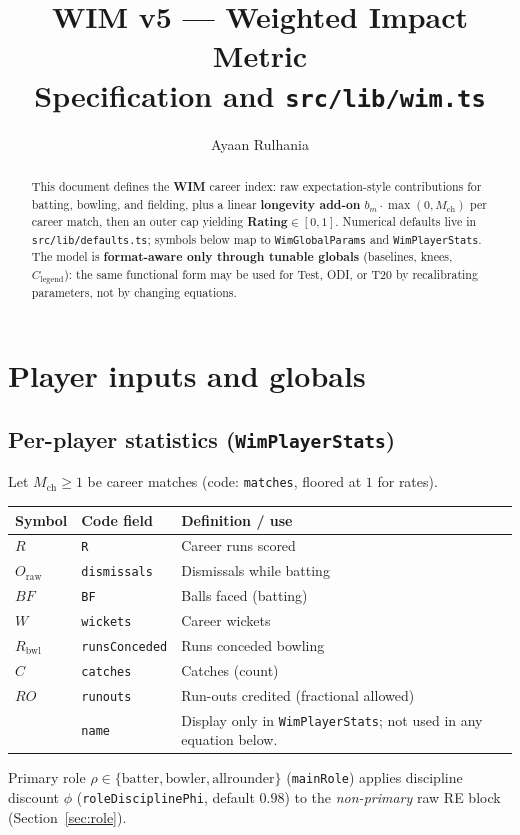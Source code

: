 \documentclass[12pt,a4paper]{article}
\title{WIM v5 --- Weighted Impact Metric\\{\large Specification and \texttt{src/lib/wim.ts}}}
\author{Ayaan Rulhania}
\date{}
\begin{document}
\maketitle

\begin{abstract}
This document defines the \textbf{WIM} career index: raw expectation-style contributions for batting, bowling, and fielding, plus a linear \textbf{longevity add-on} $b_m\cdot\max(0,M_{\mathrm{ch}})$ per career match, then an outer cap yielding \textbf{Rating}$\in[0,1]$.
Numerical defaults live in \texttt{src/lib/defaults.ts}; symbols below map to \texttt{WimGlobalParams} and \texttt{WimPlayerStats}.
The model is \textbf{format-aware only through tunable globals} (baselines, knees, $C_{\mathrm{legend}}$): the same functional form may be used for Test, ODI, or T20 by recalibrating parameters, not by changing equations.
\end{abstract}

\section{Player inputs and globals}

\subsection{Per-player statistics (\texttt{WimPlayerStats})}
Let $M_{\mathrm{ch}}\ge 1$ be career matches (code: \texttt{matches}, floored at $1$ for rates).
\begin{center}
\begin{tabular}{l|l|l}
\hline
Symbol & Code field & Definition / use \\
\hline
$R$ & \texttt{R} & Career runs scored \\
$O_{\mathrm{raw}}$ & \texttt{dismissals} & Dismissals while batting \\
$BF$ & \texttt{BF} & Balls faced (batting) \\
$W$ & \texttt{wickets} & Career wickets \\
$R_{\mathrm{bwl}}$ & \texttt{runsConceded} & Runs conceded bowling \\
$C$ & \texttt{catches} & Catches (count) \\
$RO$ & \texttt{runouts} & Run-outs credited (fractional allowed) \\
 & \texttt{name} & Display only in \texttt{WimPlayerStats}; not used in any equation below. \\
\hline
\end{tabular}
\end{center}
Primary role $\rho\in\{\mathrm{batter},\mathrm{bowler},\mathrm{allrounder}\}$ (\texttt{mainRole}) applies discipline discount $\phi$ (\texttt{roleDisciplinePhi}, default $0.98$) to the \emph{non-primary} raw RE block (Section~\ref{sec:role}).
\end{document}
